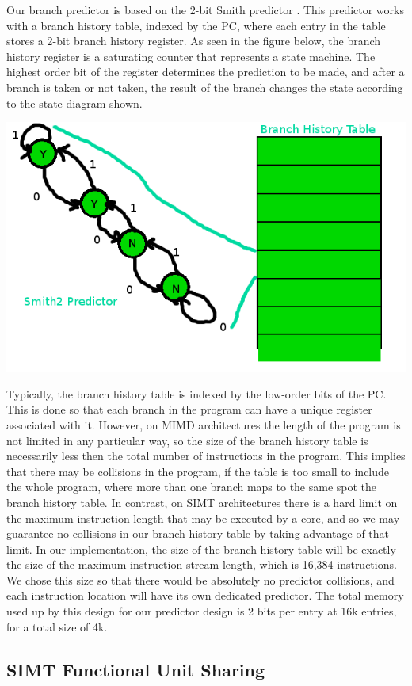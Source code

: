 \documentclass[conference]{IEEEtran}
\begin{document}
Our branch predictor is based on the 2-bit Smith predictor \cite{smith}.  This predictor works with a branch history table, indexed by the PC, where each 
entry in the table stores a 2-bit branch history register.  As seen in the figure below, the branch history register is a saturating counter that represents a state machine.  
The highest order bit of the register determines the prediction to be made, and after a branch is taken or not taken, the result of the branch 
changes the state according to the state diagram shown.

\begin{center}
	\includegraphics[width=.45\textwidth]{bht.png}
\end{center}

Typically, the branch history table is indexed by the low-order bits of the PC.  This is done so that each branch in the program can have a unique register associated with it.  However, on MIMD architectures the length of the program is not limited in any particular way,
so the size of the branch history table is necessarily less then the total number of instructions in the program.  This implies that there may be collisions in the program, if the table is too small to include the whole program, where more than 
one branch maps to the same spot the branch history table.  In contrast, on SIMT architectures there is a hard limit on the maximum instruction length that may be executed by a core, and so
we may guarantee no collisions in our branch history table by taking advantage of that limit.  In our implementation, the size of the branch history table will be exactly the size of the maximum instruction stream length, which is 16,384 instructions.  We chose this size so that there would be absolutely no predictor collisions, and each instruction location will have its own dedicated predictor.  The total memory used up by this design for our predictor design is 2 bits per entry at 16k entries, for a total size of 4k.

\subsection{SIMT Functional Unit Sharing}
\label{intuition}
\end{document}

